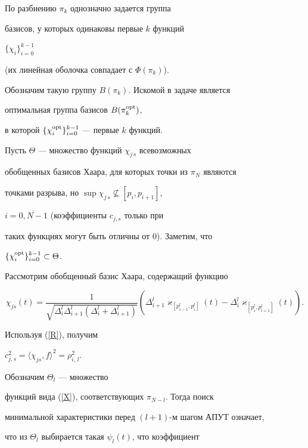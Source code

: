 По разбиению $\pi_k$ однозначно задается группа


базисов, у которых одинаковы первые $k$ функций


$\{\chi_{i}\}_{i=0}^{k-1}$


(их линейная оболочка совпадает с $\Phi(\pi_k)$).


Обозначим такую группу $B(\pi_k)$. Искомой в задаче является


оптимальная группа базисов $B(\pi_k^{\operatorname{opt}})$, 


в которой $\{\chi_{i}^{\operatorname{opt}}\}_{i=0}^{k-1}$ --- первые $k$ функций.





Пусть $\Theta$ --- множество функций $\chi_{j\,s}$ всевозможных


обобщенных базисов Хаара, для которых точки из $\pi_N$ являются


точками разрыва, но $\sup\chi_{j\,s}\nsubseteq [p_i,p_{i+1}]$,


$i=\overline{0,N-1}$ (коэффициенты $c_{j,s}$ только при


таких функциях могут быть отличны от 0). Заметим, что


$\{\chi_{i}^{\operatorname{opt}}\}_{i=0}^{k-1}\subset \Theta$.





Рассмотрим обобщенный базис Хаара, содержащий функцию


\begin{equation}


\chi_{js}(t)=\frac{1}{\sqrt{\Delta_i^l\Delta_{i+1}^l


(\Delta_i^l+\Delta_{i+1}^l)}}


(\Delta_{i+1}^l\varkappa_{[p_{i-1}^{l},p_i^{l}]}(t)-


\Delta_{i}^l\varkappa_{[p_{i}^{l},p_{i+1}^{l}]}(t)).  \label{X}


\end{equation}


Используя (\ref{R}), получим


$c_{j,s}^2=\langle\chi_{js},f\rangle^2=\rho_{i,\,l}^2$.


Обозначим $\Theta_l$ --- множество


функций вида (\ref{X}), соответствующих $\pi_{N-l}$. Тогда поиск


минимальной характеристики перед $(l+1)$-м шагом АПУТ означает,


что из $\Theta_l$ выбирается такая $\psi_l(t)$, что коэффициент


